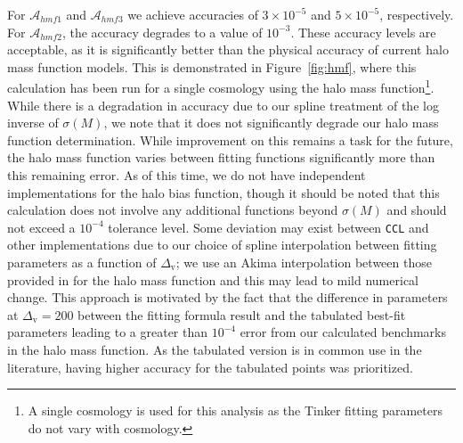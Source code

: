 \documentclass[\docopts]{\docclass}
\newcommand{\ccl}{{\tt CCL}\xspace}
\begin{document}
For $\mathcal{A}_{hmf1}$ and $\mathcal{A}_{hmf3}$ we achieve accuracies of $3\times 10^{-5}$ and $5 \times 10^{-5}$, respectively. For $\mathcal{A}_{hmf2}$, the accuracy degrades to a value of $10^{-3}$. These accuracy levels are acceptable, as it is significantly better than the physical accuracy of current halo mass function models. This is demonstrated in Figure~\ref{fig:hmf}, where this calculation has been run for a single cosmology using the \citet{Tinker2010} halo mass function\footnote{A single cosmology is used for this analysis as the Tinker fitting parameters do not vary with cosmology.}. While there is a degradation in accuracy due to our spline treatment of the log inverse of $\sigma(M)$, we note that it does not significantly degrade our halo mass function determination. While improvement on this remains a task for the future, the halo mass function varies between fitting functions significantly more than this remaining error. As of this time, we do not have independent implementations for the halo bias function, though it should be noted that this calculation does not involve any additional functions beyond $\sigma(M)$ and should not exceed a $10^{-4}$ tolerance level. Some deviation may exist between \ccl and other implementations due to our choice of spline interpolation between \citet{Tinker2010} fitting parameters as a function of $\Delta_\mathrm{v}$; we use an Akima interpolation between those provided in \citet{Tinker2010} for the halo mass function and this may lead to mild numerical change. This approach is motivated by the fact that the difference in parameters at $\Delta_\mathrm{v} = 200$ between the fitting formula result and the tabulated best-fit parameters leading to a greater than $10^{-4}$ error from our calculated benchmarks in the halo mass function. As the tabulated version is in common use in the literature, having higher accuracy for the tabulated points was prioritized.
\end{document}
